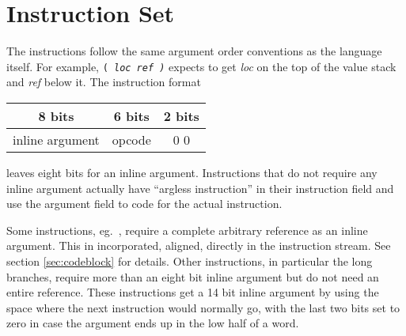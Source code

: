 \section{Instruction Set}
The instructions follow the same argument order conventions as the
language itself.  For example, \texttt{( \em loc ref \tt)}
expects to get \emph{loc} on the top of the value stack and \emph{ref}
below it.  The instruction format
\begin{center} \begin{tabular}{|c|c|c|}\hline
 8 bits          & 6 bits & 2 bits \\\hline
 inline argument & opcode & 0 0    \\\hline
\end{tabular} \end{center}
leaves eight bits for an inline argument.  Instructions that do not
require any inline argument actually have ``argless instruction'' in
their instruction field and use the argument field to code for the
actual instruction.

Some instructions, eg.\ , require a complete arbitrary
reference as an inline argument.  This in incorporated, aligned,
directly in the instruction stream.  See section \ref{sec:codeblock}
for details.  Other instructions, in particular the long branches,
require more than an eight bit inline argument but do not need an
entire reference.  These instructions get a 14 bit inline argument by
using the space where the next instruction would normally go, with the
last two bits set to zero in case the argument ends up in the low half
of a word.

\newenvironment{itable}[1]{
\begin{center} \par \nopagebreak #1 \par \nopagebreak
\begin{tabular}{|l|c|l|l|l|} \hline
\emph{instruction} & \emph{inline arg} & \emph{initial stack}
 & \emph{final stack} & \emph{extra cell args}
\\\hline\hline}{\hline\end{tabular}\end{center}}

\newcommand{\icomment}[1]{\multicolumn{5}{|l|}{\parbox{4in}{#1}}\\\hline}

